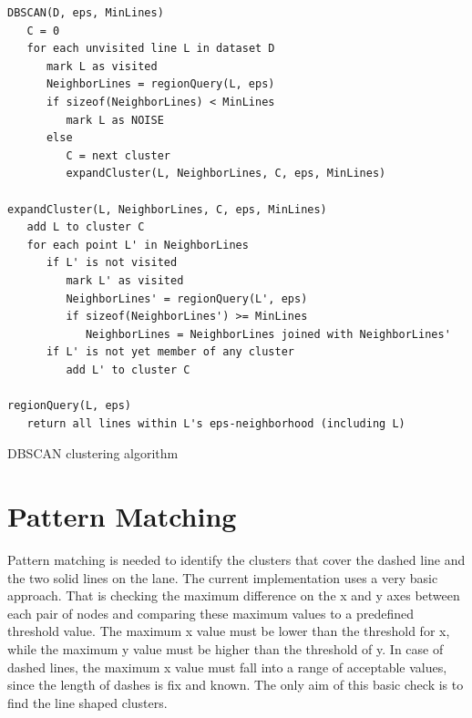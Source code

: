 \documentclass[Report.tex]{subfiles}
\begin{document}
\begin{code}[hp]
\large
\begin{verbatim}
DBSCAN(D, eps, MinLines)
   C = 0
   for each unvisited line L in dataset D
      mark L as visited
      NeighborLines = regionQuery(L, eps)
      if sizeof(NeighborLines) < MinLines
         mark L as NOISE
      else
         C = next cluster
         expandCluster(L, NeighborLines, C, eps, MinLines)

expandCluster(L, NeighborLines, C, eps, MinLines)
   add L to cluster C
   for each point L' in NeighborLines
      if L' is not visited
         mark L' as visited
         NeighborLines' = regionQuery(L', eps)
         if sizeof(NeighborLines') >= MinLines
            NeighborLines = NeighborLines joined with NeighborLines'
      if L' is not yet member of any cluster
         add L' to cluster C

regionQuery(L, eps)
   return all lines within L's eps-neighborhood (including L)
\end{verbatim}

\caption{DBSCAN clustering algorithm}
\label{pseudo:dbscan}
\end{code}

\section{Pattern Matching} %
\label{sec:Pattern Matching on Clusers}
Pattern matching is needed to identify the clusters that cover the dashed line
and the two solid lines on the lane. The current implementation uses a very
basic approach. That is checking the maximum difference on the x and y axes
between each pair of nodes and comparing these maximum values to a predefined
threshold value. The maximum x value must be lower than the threshold for x,
while the maximum y value must be higher than the threshold of y. In case of
dashed lines, the maximum x value must fall into a range of acceptable values,
since the length of dashes is fix and known. The only aim of this basic check
is to find the line shaped clusters.
\end{document}
